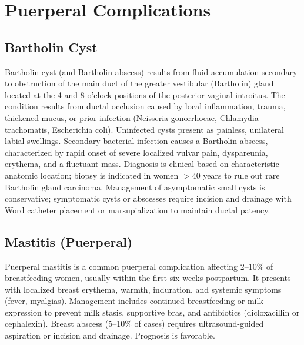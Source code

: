 \section{Puerperal Complications}








\label{sec:Puerperal Complications}

\subsection{Bartholin Cyst}
\label{sec:Bartholin Cyst}
Bartholin cyst (and Bartholin abscess) results from fluid accumulation secondary to obstruction of the main duct of the greater vestibular (Bartholin) gland located at the 4 and 8 o'clock positions of the posterior vaginal introitus. The condition results from ductal occlusion caused by local inflammation, trauma, thickened mucus, or prior infection (Neisseria gonorrhoeae, Chlamydia trachomatis, Escherichia coli). Uninfected cysts present as painless, unilateral labial swellings. Secondary bacterial infection causes a Bartholin abscess, characterized by rapid onset of severe localized vulvar pain, dyspareunia, erythema, and a fluctuant mass. Diagnosis is clinical based on characteristic anatomic location; biopsy is indicated in women $>40$ years to rule out rare Bartholin gland carcinoma. Management of asymptomatic small cysts is conservative; symptomatic cysts or abscesses require incision and drainage with Word catheter placement or marsupialization to maintain ductal patency.

\subsection{Mastitis (Puerperal)}
\label{sec:Mastitis}
Puerperal mastitis is a common puerperal complication affecting 2--10\% of breastfeeding women, usually within the first six weeks postpartum. It presents with localized breast erythema, warmth, induration, and systemic symptoms (fever, myalgias). Management includes continued breastfeeding or milk expression to prevent milk stasis, supportive bras, and antibiotics (dicloxacillin or cephalexin). Breast abscess (5--10\% of cases) requires ultrasound-guided aspiration or incision and drainage. Prognosis is favorable.

